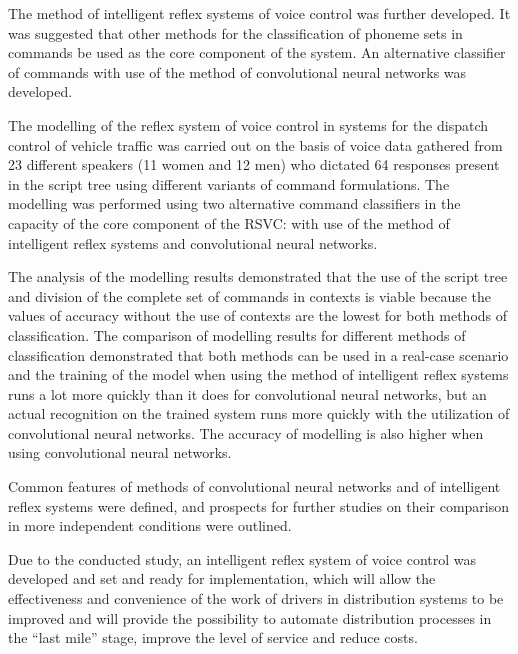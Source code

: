 The method of intelligent reflex systems of voice control was further developed. It was suggested that other methods for the classification of phoneme sets in commands be used as the core component of the system.  An alternative classifier of commands with use of the method of convolutional neural networks was developed. 

The modelling of the reflex system of voice control in systems for the dispatch control of vehicle traffic was carried out on the basis of voice data gathered from 23 different speakers (11 women and 12 men) who dictated 64 responses present in the script tree using different variants of command formulations. The modelling was performed using two alternative command classifiers in the capacity of the core component of the RSVC: with use of the method of intelligent reflex systems and convolutional neural networks. 

The analysis of the modelling results demonstrated that the use of the script tree and division of the complete set of commands in contexts is viable because the values of accuracy without the use of contexts are the lowest for both methods of classification. The comparison of modelling results for different methods of classification demonstrated that both methods can be used in a real-case scenario and the training of the model when using the method of intelligent reflex systems runs a lot more quickly than it does for convolutional neural networks, but an actual recognition on the trained system runs more quickly with the utilization of convolutional neural networks. The accuracy of modelling is also higher when using convolutional neural networks. 

Common features of methods of convolutional neural networks and of intelligent reflex systems were defined, and prospects for further studies on their comparison in more independent conditions were outlined. 

Due to the conducted study, an intelligent reflex system of voice control was developed and set and ready for implementation, which will allow the effectiveness and convenience of the work of drivers in distribution systems to be improved and will provide the possibility to automate distribution processes in the “last mile” stage, improve the level of service and reduce costs. 

